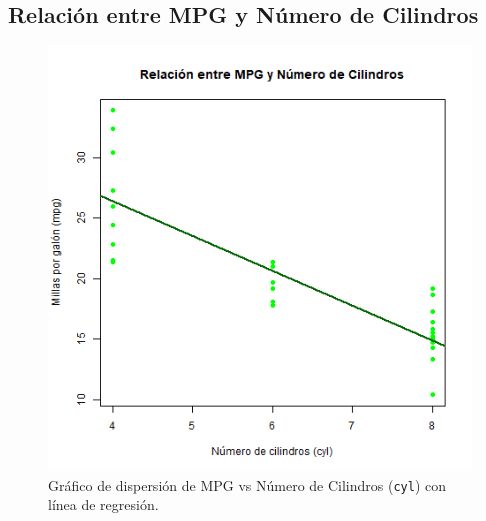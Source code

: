 \documentclass{article}
\begin{document}
\begin{itemize}
\section*{Relación entre MPG y Número de Cilindros}
\begin{figure}[H]
    \centering
    \includegraphics[width=\textwidth]{mpg_vs_cyl.png}
    \caption{Gráfico de dispersión de MPG vs Número de Cilindros (\texttt{cyl}) con línea de regresión.}
    \label{fig:mpg_vs_cyl}
\end{figure}


\end{itemize}
\end{document}
